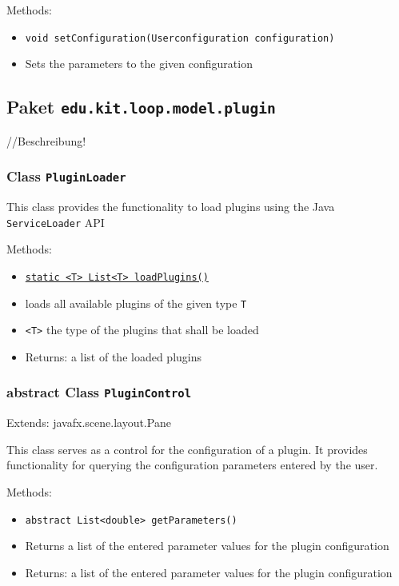 \documentclass[parskip=full,11pt]{scrartcl}
\begin{document}
Methods:
\begin{itemize}\itemsep -10pt
\item \texttt{void setConfiguration(Userconfiguration configuration)}
\item[] Sets the parameters to the given configuration

\end{itemize}

\subsection{Paket \texttt{edu.kit.loop.model.plugin}}
//Beschreibung!

\subsubsection{Class \texttt{PluginLoader}}

This class provides the functionality to load plugins using the Java \texttt{ServiceLoader} API

Methods:

\begin{itemize}\itemsep -10pt
	\item \underline{\texttt{static <T> List<T> loadPlugins()}}
	\item[] loads all available plugins of the given type \texttt{T}
	\item[] \texttt{<T>} the type of the plugins that shall be loaded
	\item[]Returns: a list of the loaded plugins
\end{itemize}

\subsubsection{abstract Class \texttt{PluginControl}}
Extends: javafx.scene.layout.Pane
 
This class serves as a control for the configuration of a plugin. It provides functionality for querying the configuration parameters entered by the user.

Methods:

\begin{itemize}\itemsep -10pt
	\item \texttt{abstract List<double> getParameters()}
	\item[] Returns a list of the entered parameter values for the plugin configuration
	\item[] Returns: a list of the entered parameter values for the plugin configuration
\end{itemize}
\end{document}
